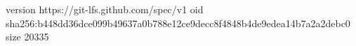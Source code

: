 version https://git-lfs.github.com/spec/v1
oid sha256:b448dd36dce099b49637a0b788e12ce9decc8f4848b4de9edea14b7a2a2debc0
size 20335
